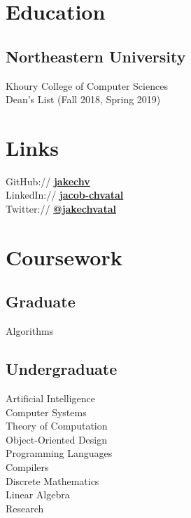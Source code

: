 \documentclass[letterpaper]{resume} %
\begin{document}
\begin{minipage}[t]{0.33\textwidth} %

\section{Education}
\subsection{Northeastern University}
Khoury College of Computer Sciences \\
Dean's List (Fall 2018, Spring 2019) \\
 \sectionspace %

\section{Links}
GitHub:// \href{https://github.com/jakechv}{\bf jakechv} \\
LinkedIn:// \href{https://www.linkedin.com/in/jacob-chvatal}{\bf jacob-chvatal} \\
Twitter:// \href{https://twitter.com/jakechvatal}{\bf @jakechvatal} \\
\sectionspace %

\section{Coursework}
\subsection{Graduate}
Algorithms
\sectionspace %

\subsection{Undergraduate}
Artificial Intelligence \\
Computer Systems \\
Theory of Computation \\
Object-Oriented Design \\
Programming Languages \\
Compilers \\
Discrete Mathematics \\
Linear Algebra \\
Research
\sectionspace %


\end{minipage}
\end{document}
